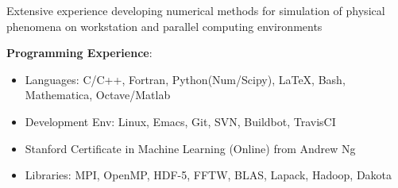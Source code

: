 Extensive experience developing numerical methods for simulation of physical phenomena
on workstation and parallel computing environments

\blankline

\textbf{Programming Experience}: 
\begin{itemize}
\itemsep 0pt
\item Languages: C/C++, Fortran, Python(Num/Scipy), \LaTeX{}, Bash, Mathematica, Octave/Matlab
\item Development Env: Linux, Emacs, Git, SVN, Buildbot, TravisCI
\item Stanford Certificate in Machine Learning (Online) from Andrew Ng
\item Libraries: MPI, OpenMP, HDF-5, FFTW, BLAS, Lapack, Hadoop, Dakota
\end{itemize}
